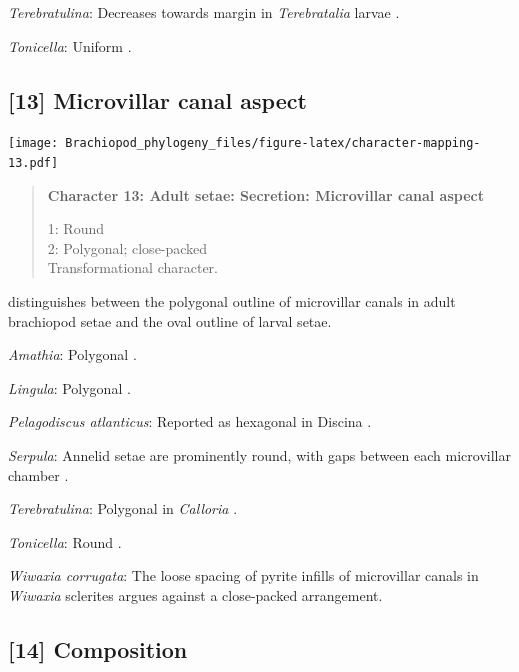 \documentclass[openany]{book}
\begin{document}
\hypertarget{Terebratulina-coding-12}{}
\emph{Terebratulina}: Decreases towards margin in \emph{Terebratalia}
larvae \citep{Gustus1972}.

\hypertarget{Tonicella-coding-12}{}
\emph{Tonicella}: Uniform \citep{Fischer1980, Leise1982}.

\subsection*{{[}13{]} Microvillar canal
aspect}\label{microvillar-canal-aspect}

\texttt{[image: Brachiopod\_phylogeny\_files/figure-latex/character-mapping-13.pdf]}

\begin{quote}
\textbf{Character 13: Adult setae: Secretion: Microvillar canal aspect}

1: Round\\
2: Polygonal; close-packed\\
Transformational character.
\end{quote}

\citet{Luter2000} distinguishes between the polygonal outline of
microvillar canals in adult brachiopod setae and the oval outline of
larval setae.

\hypertarget{Amathia-coding-13}{}
\emph{Amathia}: Polygonal \citep{Gordon1975}.

\hypertarget{Lingula-coding-13}{}
\emph{Lingula}: Polygonal \citep{Luter2000}.

\hypertarget{Pelagodiscus_atlanticus-coding-13}{}
\emph{Pelagodiscus atlanticus}: Reported as hexagonal in Discina
\citep{Luter2000}.

\hypertarget{Serpula-coding-13}{}
\emph{Serpula}: Annelid setae are prominently round, with gaps between
each microvillar chamber \citep{Orrhage1971}.

\hypertarget{Terebratulina-coding-13}{}
\emph{Terebratulina}: Polygonal in \emph{Calloria} \citep{Luter2000}.

\hypertarget{Tonicella-coding-13}{}
\emph{Tonicella}: Round \citep{Fischer1980}.

\hypertarget{Wiwaxia_corrugata-coding-13}{}
\emph{Wiwaxia corrugata}: The loose spacing of pyrite infills of
microvillar canals in \emph{Wiwaxia} sclerites \citep{Smith2014} argues
against a close-packed arrangement.

\subsection*{{[}14{]} Composition}\label{composition}
\end{document}
